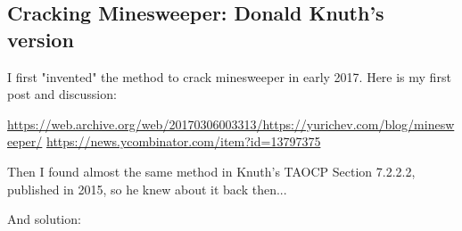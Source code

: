 \subsection{Cracking Minesweeper: Donald Knuth's version}

\renewcommand{\CURPATH}{equations/minesweeper_Knuth}

I first "invented" the method to crack minesweeper in early 2017.
Here is my first post and discussion:

\url{https://web.archive.org/web/20170306003313/https://yurichev.com/blog/minesweeper/}
\url{https://news.ycombinator.com/item?id=13797375}

Then I found almost the same method in Knuth's TAOCP Section 7.2.2.2, published in 2015, so he knew about it back then...

\begin{figure}[H]
\centering
{}
\end{figure}

\begin{figure}[H]
\centering
{}
\end{figure}

And solution:

\begin{figure}[H]
\centering
{}
\end{figure}

\begin{figure}[H]
\centering
{}
\end{figure}
